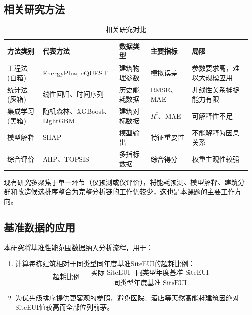\subsection{相关研究方法}

\begin{table}[H]
\centering
\caption{相关研究对比}
\label{tab:literature}
\begin{tabular}{p{1.8cm}p{2.5cm}p{2.8cm}p{2.5cm}p{2.5cm}}
\hline
\textbf{方法类别} & \textbf{代表方法} & \textbf{数据类型} & \textbf{主要指标} & \textbf{局限} \\
\hline
工程法(白箱) & EnergyPlus, eQUEST & 建筑物理参数 & 模拟误差 & 参数要求高，难以大规模应用 \\
\hline
统计法(灰箱) & 线性回归、时间序列 & 历史能耗数据 & RMSE、MAE \cite{ashrae_energy} & 非线性关系捕捉能力有限 \\
\hline
集成学习(黑箱) & 随机森林、XGBoost、LightGBM \cite{rf_breiman}\cite{xgboost_chen}\cite{lgbm_ke} & 建筑对标数据 & $R^2$、MAE & 可解释性不足 \\
\hline
模型解释 & SHAP \cite{shap_lundberg} & 模型输出 & 特征重要性 & 不能解释为因果关系 \\
\hline
综合评价 & AHP、TOPSIS \cite{ahp_saaty} & 多指标数据 & 综合得分 & 权重主观性较强 \\
\hline
\end{tabular}
\end{table}

现有研究多聚焦于单一环节（仅预测或仅评价），将能耗预测、模型解释、建筑分群和改造候选排序整合为完整分析链的工作仍较少，这也是本课题的主要工作方向。

\subsection{基准数据的应用}

本研究将基准性能范围数据纳入分析流程，用于：
\begin{enumerate}
    \item 计算每栋建筑相对于同类型同年度基准SiteEUI的超耗比例：\[ \text{超耗比例} = \frac{\text{实际 SiteEUI} - \text{同类型年度基准 SiteEUI}}{\text{同类型年度基准 SiteEUI}} \]
    \item 为优先级排序提供更客观的参照，避免医院、酒店等天然高能耗建筑因绝对SiteEUI值较高而全部位列前茅。
\end{enumerate}